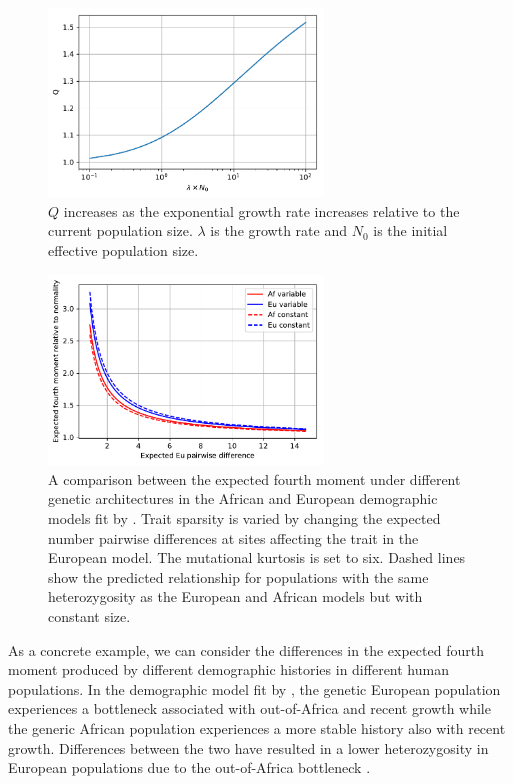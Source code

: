\begin{figure}
\centering
\includegraphics[width=0.65\textwidth]{figures/exp_growth.pdf}
\caption{$Q$ increases as the exponential growth rate increases relative to the current
population size. $\lambda$ is the growth rate and $N_0$ is the initial effective
population size.}
\label{fig:Qexp}
\end{figure}

\begin{figure}
\centering
\includegraphics[width=0.65\textwidth]{figures/af_eu_mom4.pdf}
\caption{A comparison between the expected fourth moment under different genetic
architectures in the African and European demographic models fit
by \citet{Tennessen2012}. Trait sparsity is varied by changing the expected
number pairwise differences at sites affecting the trait in the European model.
The mutational kurtosis is set to six. Dashed lines show the predicted
relationship for populations with the same heterozygosity as the European and
African models but with constant size.}
\label{fig:afeucomp}
\end{figure}

As a concrete example, we can consider the differences in the expected fourth
moment produced by different demographic histories in different human
populations. In the demographic model fit by \citet{Tennessen2012}, the genetic
European population experiences a bottleneck associated with out-of-Africa and
recent growth while the generic African population experiences a more stable
history also with recent growth. Differences between the two have resulted in a
lower heterozygosity in European populations due to the out-of-Africa
bottleneck \citep{Yu2002}.

